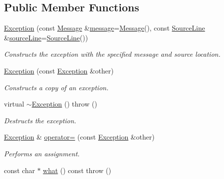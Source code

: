 \subsection*{Public Member Functions}
\begin{DoxyCompactItemize}
\item 
\hyperlink{class_exception_aac5e9386080a8eac2edebf02c8169ecc}{Exception} (const \hyperlink{class_message}{Message} \&\hyperlink{class_exception_aab5c1504a18016fdfe7574eb81f59ac6}{message}=\hyperlink{class_message}{Message}(), const \hyperlink{class_source_line}{Source\-Line} \&\hyperlink{class_exception_a67f40ff3ea7f1c07e46222c38dcbaf43}{source\-Line}=\hyperlink{class_source_line}{Source\-Line}())
\begin{DoxyCompactList}\small\item\em Constructs the exception with the specified message and source location. \end{DoxyCompactList}\item 
\hyperlink{class_exception_ae0fd52e62283ee92c085d767d0aab736}{Exception} (const \hyperlink{class_exception}{Exception} \&other)
\begin{DoxyCompactList}\small\item\em Constructs a copy of an exception. \end{DoxyCompactList}\item 
\hypertarget{class_exception_ad1ba411de295ef2eeb02ba26284a829a}{virtual \hyperlink{class_exception_ad1ba411de295ef2eeb02ba26284a829a}{$\sim$\-Exception} ()  throw ()}\label{class_exception_ad1ba411de295ef2eeb02ba26284a829a}

\begin{DoxyCompactList}\small\item\em Destructs the exception. \end{DoxyCompactList}\item 
\hypertarget{class_exception_a71c844ee3ac32b7656c24386e9ab60a0}{\hyperlink{class_exception}{Exception} \& \hyperlink{class_exception_a71c844ee3ac32b7656c24386e9ab60a0}{operator=} (const \hyperlink{class_exception}{Exception} \&other)}\label{class_exception_a71c844ee3ac32b7656c24386e9ab60a0}

\begin{DoxyCompactList}\small\item\em Performs an assignment. \end{DoxyCompactList}\item 
\hypertarget{class_exception_a45642915395d3b813fedc2593fbcb8bb}{const char $\ast$ \hyperlink{class_exception_a45642915395d3b813fedc2593fbcb8bb}{what} () const   throw ()}\label{class_exception_a45642915395d3b813fedc2593fbcb8bb}


\end{DoxyCompactItemize}
